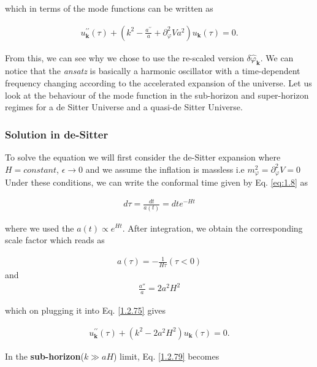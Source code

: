 which in terms of the mode functions can be written as

\begin{align}
    u_{\mathbf{k}}^{\prime \prime}(\tau)+\left(k^{2}-\frac{a^{\prime \prime}}{a}+\partial_{\varphi}^{2} V a^{2}\right) u_{\mathbf{k}}(\tau)=0 . \label{1.2.75}
\end{align}

 From this, we can see why we chose to use the re-scaled version  $\delta \hat{\varphi}_{\mathbf{k}}$. We can notice that the \emph{ansatz} is basically a harmonic oscillator with a time-dependent frequency changing according to the accelerated expansion of the universe. Let us look at the behaviour of the mode function in the sub-horizon and super-horizon regimes for a de Sitter Universe and a quasi-de Sitter Universe.

\subsubsection*{Solution in de-Sitter}
To solve the equation we will first consider the de-Sitter expansion where $H = constant$, $\epsilon \rightarrow 0$  and we assume the inflation is massless i.e 
\(m_{\varphi}^2 = \partial_{\varphi}^2{V} = 0\)
Under these conditions, we can write the  conformal time given by Eq. \eqref{eq:1.8} as

\begin{align}
    d \tau=\frac{d t}{a(t)}=d t e^{-H t} \label{1.2.76}
\end{align}

where we used the $a(t) \propto e^{Ht}$. After integration, we obtain the corresponding scale factor which reads as

\begin{align}
    a(\tau) = -\frac{1}{H\tau}(\tau < 0)  \label{1.2.77}
\end{align}
and
\begin{align}
    \frac{a''}{a} = 2a^2H^2 \label{1.2.78}
\end{align}

which on plugging it into Eq. \eqref{1.2.75} gives

\begin{align}
    u_{\mathbf{k}}^{\prime \prime}(\tau)+\left(k^{2}-2 a^{2} H^{2}\right) u_{\mathbf{k}}(\tau)=0 .\label{1.2.79}
\end{align}



In the \textbf{sub-horizon}($k \gg a H$) limit, Eq. \eqref{1.2.79} becomes

